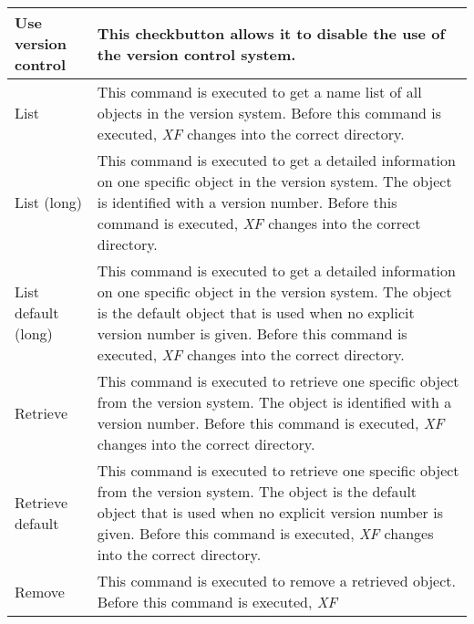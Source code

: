 {\newpage
\clearpage
\samepage \begin{figure}[hbt]
  \centerline{
  \epsfysize=7cm
  }
  
  \label{fig:The procedure XFProcOptionsVersion}
\end{figure}
}

{\newpage
\clearpage
\samepage \begin{supertabular}{|l|p{7.5cm}|}
Use version control     & This checkbutton allows it to
                          disable the use of the version
                          control system.\\  \hline
List                    & This command is executed to get a
                          name list of all objects in the
                          version system. Before this
                          command is executed, {\em XF }
 changes
                          into the correct directory.\\  \hline
List (long)             & This command is executed to get a
                          detailed information on one
                          specific object in the version
                          system. The object is identified
                          with a version number. Before this
                          command is executed, {\em XF }
 changes
                          into the correct directory.\\  \hline
List default (long)     & This command is executed to get a
                          detailed information on one
                          specific object in the version
                          system. The object is the default
                          object that is used when no
                          explicit version number is given.
                          Before this command is executed,
                          {\em XF }
 changes into the correct
                          directory.\\  \hline
Retrieve                & This command is executed to
                          retrieve one specific object from
                          the version system. The object is
                          identified with a version number.
                          Before this command is executed,
                          {\em XF }
 changes into the correct
                          directory.\\  \hline
Retrieve default        & This command is executed to
                          retrieve one specific object from
                          the version system. The object is
                          the default object that is used
                          when no explicit version number is
                          given. Before this command is
                          executed, {\em XF }
 changes into the
                          correct directory.\\  \hline
Remove                  & This command is executed to
                          remove a retrieved object. Before
                          this command is executed, {\em XF }


\end{supertabular}}
